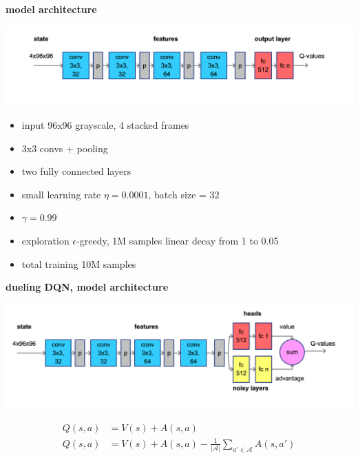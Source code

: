 \documentclass[xcolor=dvipsnames]{beamer}
\begin{document}
\begin{frame}{\bf model architecture}

  {\centering \includegraphics[scale=0.15]{../diagrams/architectures/dqnbasic.png}}

  \begin{itemize}
    \item input 96x96 grayscale, 4 stacked frames
    \item 3x3 convs + pooling
    \item two fully connected layers
    \item small learning rate $\eta = 0.0001$, batch size = 32
    \item $\gamma = 0.99$
    \item exploration $\epsilon$-greedy, 1M samples linear decay from 1 to 0.05
    \item total training 10M samples
  \end{itemize}
 
\end{frame}


\begin{frame}{\bf dueling DQN, model architecture}

  {\centering \includegraphics[scale=0.15]{../diagrams/architectures/duelingdqn.png}}

  \begin{align*}
    Q(s, a) &= V(s) + A(s, a) \\
    Q(s, a) &= V(s) + A(s, a) - \frac{1}{|\mathcal{A}|}\sum_{a' \in \mathcal{A}}A(s, a')
  \end{align*}


\end{frame}
\end{document}
